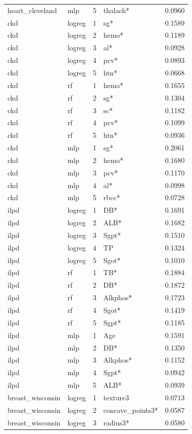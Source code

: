 \begin{tabular}{llrlr}
heart\_cleveland & mlp & 5 & thalach* & 0.0960 \\
ckd & logreg & 1 & sg* & 0.1589 \\
ckd & logreg & 2 & hemo* & 0.1189 \\
ckd & logreg & 3 & al* & 0.0928 \\
ckd & logreg & 4 & pcv* & 0.0893 \\
ckd & logreg & 5 & htn* & 0.0668 \\
ckd & rf & 1 & hemo* & 0.1655 \\
ckd & rf & 2 & sg* & 0.1304 \\
ckd & rf & 3 & sc* & 0.1182 \\
ckd & rf & 4 & pcv* & 0.1099 \\
ckd & rf & 5 & htn* & 0.0936 \\
ckd & mlp & 1 & sg* & 0.2061 \\
ckd & mlp & 2 & hemo* & 0.1680 \\
ckd & mlp & 3 & pcv* & 0.1170 \\
ckd & mlp & 4 & al* & 0.0998 \\
ckd & mlp & 5 & rbcc* & 0.0728 \\
ilpd & logreg & 1 & DB* & 0.1691 \\
ilpd & logreg & 2 & ALB* & 0.1682 \\
ilpd & logreg & 3 & Sgpt* & 0.1510 \\
ilpd & logreg & 4 & TP & 0.1324 \\
ilpd & logreg & 5 & Sgot* & 0.1010 \\
ilpd & rf & 1 & TB* & 0.1884 \\
ilpd & rf & 2 & DB* & 0.1872 \\
ilpd & rf & 3 & Alkphos* & 0.1723 \\
ilpd & rf & 4 & Sgot* & 0.1419 \\
ilpd & rf & 5 & Sgpt* & 0.1185 \\
ilpd & mlp & 1 & Age & 0.1591 \\
ilpd & mlp & 2 & DB* & 0.1350 \\
ilpd & mlp & 3 & Alkphos* & 0.1152 \\
ilpd & mlp & 4 & Sgpt* & 0.0942 \\
ilpd & mlp & 5 & ALB* & 0.0939 \\
breast\_wisconsin & logreg & 1 & texture3 & 0.0713 \\
breast\_wisconsin & logreg & 2 & concave\_points3* & 0.0587 \\
breast\_wisconsin & logreg & 3 & radius3* & 0.0580 \\

\end{tabular}
